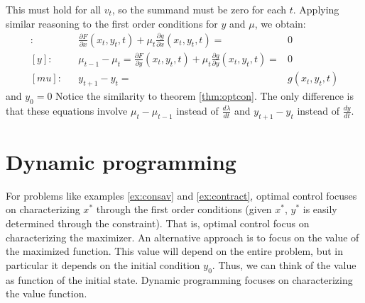 \documentclass[12pt,reqno]{amsart}
\theoremstyle{definition}
\begin{document}
This must hold for all $v_t$, so the summand must be zero for each
$t$. Applying similar reasoning to the first order conditions for $y$
and $\mu$, we obtain:
\begin{align*}
  [x]:&& \frac{\partial F}{\partial x}(x_t,y_t,t)  + \mu_t \frac{\partial
    g}{\partial x}(x_t,y_t,t) = &  0 \\
  [y]: && \mu_{t-1}-\mu_t = \frac{\partial F}{\partial
    y}(x_t,y_t,t)  + \mu_t \frac{\partial 
    g}{\partial y}(x_t,y_t,t) = &  0 \\
  [mu]:&& y_{t+1} - y_t = & g(x_t,y_t,t) 
\end{align*}
and $y_0 = 0$
Notice the similarity to theorem \ref{thm:optcon}. The only difference 
is that these equations involve $\mu_{t} - \mu_{t-1}$ instead of
$\frac{d\lambda}{dt}$ and $y_{t+1}-y_t$ instead of $\frac{dy}{dt}$. 

\section{Dynamic programming}

For problems like examples \ref{ex:consav} and \ref{ex:contract},
optimal control focuses on characterizing $x^*$ through the first
order conditions (given $x^*$, $y^*$ is easily determined through the
constraint). That is, optimal control focus on characterizing the maximizer. An
alternative approach is to focus on the value of the maximized
function. This value will depend on the entire problem, but in
particular it depends on the initial condition $y_0$. Thus, we can
think of the value as function of the initial state. Dynamic
programming focuses on characterizing the value function.  
\end{document}
